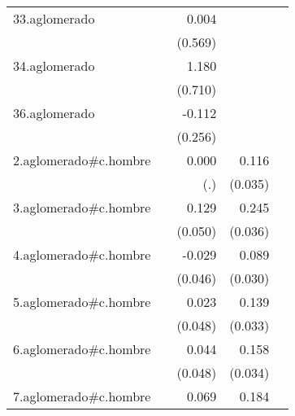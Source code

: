 {\begin{longtable}{l*{4}{D{.}{.}{-1}}}
\addlinespace
33.aglomerado&                     &       0.004         &                     &                     \\
            &                     &     (0.569)         &                     &                     \\
\addlinespace
34.aglomerado&                     &       1.180         &                     &                     \\
            &                     &     (0.710)         &                     &                     \\
\addlinespace
36.aglomerado&                     &      -0.112         &                     &                     \\
            &                     &     (0.256)         &                     &                     \\
\addlinespace
2.aglomerado#c.hombre&                     &       0.000         &       0.116\sym{***}&                     \\
            &                     &         (.)         &     (0.035)         &                     \\
\addlinespace
3.aglomerado#c.hombre&                     &       0.129\sym{**} &       0.245\sym{***}&                     \\
            &                     &     (0.050)         &     (0.036)         &                     \\
\addlinespace
4.aglomerado#c.hombre&                     &      -0.029         &       0.089\sym{**} &                     \\
            &                     &     (0.046)         &     (0.030)         &                     \\
\addlinespace
5.aglomerado#c.hombre&                     &       0.023         &       0.139\sym{***}&                     \\
            &                     &     (0.048)         &     (0.033)         &                     \\
\addlinespace
6.aglomerado#c.hombre&                     &       0.044         &       0.158\sym{***}&                     \\
            &                     &     (0.048)         &     (0.034)         &                     \\
\addlinespace
7.aglomerado#c.hombre&                     &       0.069         &       0.184\sym{***}&                     \\

\end{longtable}}
